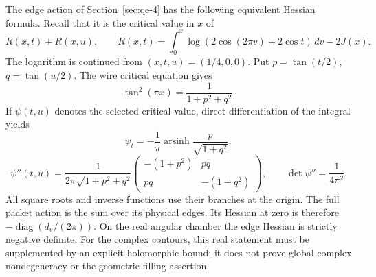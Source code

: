 The edge action of Section~\ref{sec:qe-4} has the following
equivalent Hessian formula. Recall that it is the critical value in
\(x\) of
\[
R(x,t)+R(x,u),\qquad
R(x,t)=\int_0^x\log(2\cos(2\pi v)+2\cos t)\,dv-2J(x).
\]
The logarithm is continued from \((x,t,u)=(1/4,0,0)\). Put \(p=\tan(t/2)\), \(q=\tan(u/2)\). The wire critical equation gives
\[
\tan^2(\pi x)=\frac1{1+p^2+q^2}.
\]
If \(\psi(t,u)\) denotes the selected critical value, direct differentiation of the integral yields
\[
\psi_t=-\frac1\pi\operatorname{arsinh}
               \frac{p}{\sqrt{1+q^2}},
\]
\[
\psi''(t,u)=\frac1{2\pi\sqrt{1+p^2+q^2}}
\begin{pmatrix}-(1+p^2)&pq\\pq&-(1+q^2)\end{pmatrix},
\qquad \det\psi''=\frac1{4\pi^2}.
\]
All square roots and inverse functions use their branches at the origin. The full packet action is the sum over its physical edges. Its Hessian at zero is therefore \(-\operatorname{diag}(d_v/(2\pi))\). On the real angular chamber the edge Hessian is strictly negative definite. For the complex contours, this real statement must be supplemented by an explicit holomorphic bound; it does not prove global complex nondegeneracy or the geometric filling assertion.

